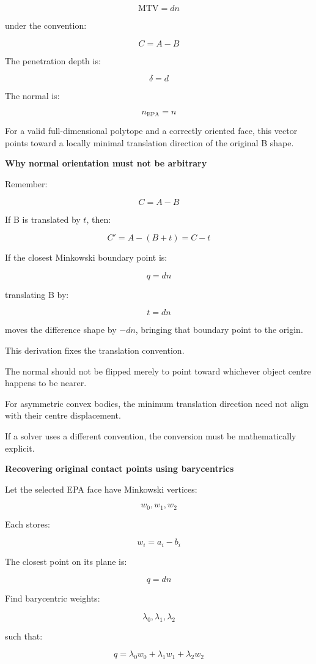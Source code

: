 \[
\boxed{ \mathrm{MTV}=dn }
\]

under the convention:

\[
C=A-B
\]

The penetration depth is:

\[
\boxed{\delta=d}
\]

The normal is:

\[
\boxed{n_{\mathrm{EPA}}=n}
\]

For a valid full-dimensional polytope and a correctly oriented face, this vector points toward a locally minimal translation direction of the original B shape.

\textbf{Why normal orientation must not be arbitrary}

Remember:

\[
C=A-B
\]

If B is translated by \(t\), then:

\[
C'=A-(B+t)=C-t
\]

If the closest Minkowski boundary point is:

\[
q=dn
\]

translating B by:

\[
t=dn
\]

moves the difference shape by \(-dn\), bringing that boundary point to the origin.

This derivation fixes the translation convention.

The normal should not be flipped merely to point toward whichever object centre happens to be nearer.

For asymmetric convex bodies, the minimum translation direction need not align with their centre displacement.

If a solver uses a different convention, the conversion must be mathematically explicit.

\textbf{Recovering original contact points using barycentrics}

Let the selected EPA face have Minkowski vertices:

\[
w_0,w_1,w_2
\]

Each stores:

\[
w_i=a_i-b_i
\]

The closest point on its plane is:

\[
q=dn
\]

Find barycentric weights:

\[
\lambda_0,\lambda_1,\lambda_2
\]

such that:

\[
\boxed{ q=\lambda_0w_0+\lambda_1w_1+\lambda_2w_2 }
\]


